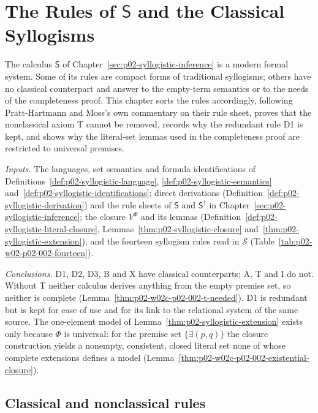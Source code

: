 \chapter{The Rules of \texorpdfstring{\(\mathsf S\)}{S} and the Classical Syllogisms}
\label{sec:p02-w02c-p02-002-rules}

The calculus \(\mathsf S\) of Chapter~\ref{sec:p02-syllogistic-inference}
is a modern formal system. Some of its rules are compact forms of
traditional syllogisms; others have no classical counterpart and answer to
the empty-term semantics or to the needs of the completeness proof. This
chapter sorts the rules accordingly, following Pratt-Hartmann and Moss's own
commentary on their rule sheet, proves that the nonclassical axiom T cannot
be removed, records why the redundant rule D1 is kept, and shows why the
literal-set lemmas used in the completeness proof are restricted to
universal premises.

\emph{Inputs.} The languages, set semantics and formula identifications of
Definitions~\ref{def:p02-syllogistic-language},
\ref{def:p02-syllogistic-semantics}
and~\ref{def:p02-syllogistic-identifications}; direct derivations
(Definition~\ref{def:p02-syllogistic-derivation}) and the rule sheets of
\(\mathsf S\) and \(\mathsf S^\dagger\) in
Chapter~\ref{sec:p02-syllogistic-inference}; the closure \(V^\Phi\) and its
lemmas (Definition~\ref{def:p02-syllogistic-literal-closure},
Lemmas~\ref{thm:p02-syllogistic-closure}
and~\ref{thm:p02-syllogistic-extension}); and the fourteen syllogism rules
read in \(\mathcal S\) (Table~\ref{tab:p02-w02-p02-002-fourteen}).

\emph{Conclusions.} D1, D2, D3, B and X have classical counterparts; A, T
and I do not. Without T neither calculus derives anything from the empty premise
set, so neither is complete
(Lemma~\ref{thm:p02-w02c-p02-002-t-needed}). D1 is redundant but is kept
for ease of use and for its link to the relational system of the same
source. The one-element model of Lemma~\ref{thm:p02-syllogistic-extension}
exists only because \(\Phi\) is universal: for the premise set
\(\{\exists(p,q)\}\) the closure construction yields a nonempty, consistent,
closed literal set none of whose complete extensions defines a model
(Lemma~\ref{thm:p02-w02c-p02-002-existential-closure}).

\section{Classical and nonclassical rules}
\label{sec:p02-w02c-p02-002-classical}

